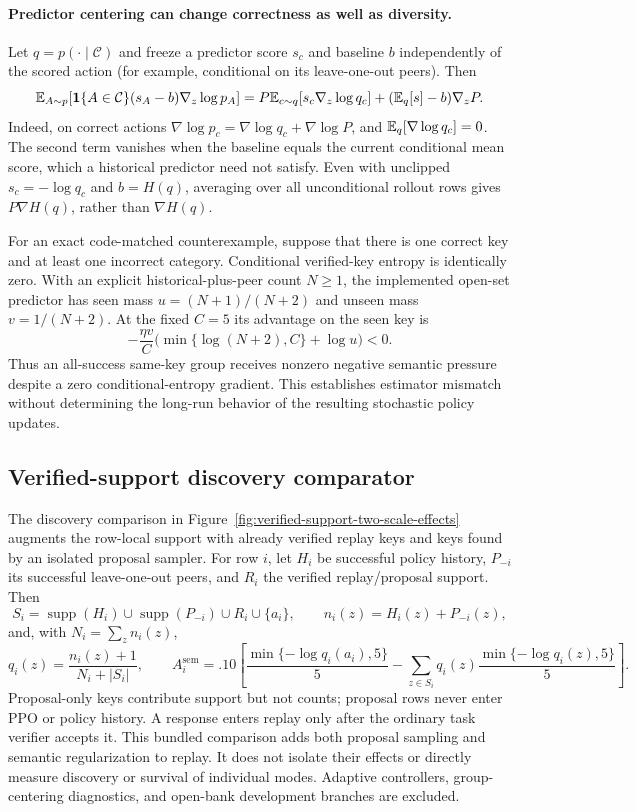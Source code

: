 \paragraph{Predictor centering can change correctness as well as diversity.}
Let $q=p(\cdot\mid\mathcal C)$ and freeze a predictor score $s_c$ and baseline
$b$ independently of the scored action (for example, conditional on its
leave-one-out peers). Then
\[
 \mathbb E_{A\sim p}\!\left[\mathbf 1\{A\in\mathcal C\}(s_A-b)
                  \nabla_z\log p_A\right]
 =P\mathbb E_{c\sim q}[s_c\nabla_z\log q_c]
  +(\mathbb E_q[s]-b)\nabla_zP.
\]
Indeed, on correct actions
$\nabla\log p_c=\nabla\log q_c+\nabla\log P$, and
$\mathbb E_q[\nabla\log q_c]=0$.
The second term vanishes when the baseline equals the current conditional
mean score, which a historical predictor need not satisfy. Even with
unclipped $s_c=-\log q_c$ and $b=H(q)$, averaging over all unconditional
rollout rows gives $P\nabla H(q)$, rather than $\nabla H(q)$.

For an exact code-matched counterexample, suppose that there is one correct
key and at least one incorrect category. Conditional verified-key entropy is
identically zero. With an explicit historical-plus-peer count $N\ge1$, the
implemented open-set predictor has seen mass $u=(N+1)/(N+2)$ and unseen mass
$v=1/(N+2)$. At the fixed $C=5$ its advantage on the seen key is
\[
 -\frac{\eta v}{C}\bigl(\min\{\log(N+2),C\}+\log u\bigr)<0.
\]
Thus an all-success same-key group receives nonzero negative semantic
pressure despite a zero conditional-entropy gradient. This establishes
estimator mismatch without determining the long-run behavior of the resulting
stochastic policy updates.

\subsection{Verified-support discovery comparator}
\label{app:verified-support-semantic-estimator}

The discovery comparison in Figure~\ref{fig:verified-support-two-scale-effects}
augments the row-local support with already verified replay keys and keys found
by an isolated proposal sampler. For row $i$, let $H_i$ be successful policy
history, $P_{-i}$ its successful leave-one-out peers, and $R_i$ the verified
replay/proposal support. Then
\[
 S_i=\operatorname{supp}(H_i)\cup\operatorname{supp}(P_{-i})\cup R_i\cup\{a_i\},
 \qquad n_i(z)=H_i(z)+P_{-i}(z),
\]
and, with $N_i=\sum_z n_i(z)$,
\begin{equation}
 q_i(z)=\frac{n_i(z)+1}{N_i+|S_i|},\qquad
 A_i^{\mathrm{sem}}=.10\!\left[
 \frac{\min\{-\log q_i(a_i),5\}}{5}
 -\sum_{z\in S_i}q_i(z)\frac{\min\{-\log q_i(z),5\}}{5}\right].
 \label{eq:verified-support-semantic-advantage}
\end{equation}
Proposal-only keys contribute support but not counts; proposal rows never enter
PPO or policy history. A response enters replay only after the ordinary task
verifier accepts it. This bundled comparison adds both proposal sampling and
semantic regularization to replay. It does not isolate their effects or
directly measure discovery or survival of individual modes. Adaptive
controllers, group-centering diagnostics, and open-bank development branches
are excluded.

